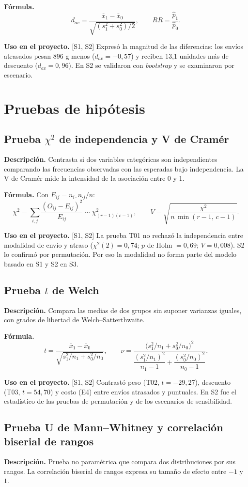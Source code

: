 \documentclass[11pt,a4paper]{article}
\newcommand{\desc}{\textbf{Descripción.} }
\newcommand{\formula}{\textbf{Fórmula.} }
\newcommand{\uso}{\textbf{Uso en el proyecto.} }
\newcommand{\fase}[1]{{\footnotesize\color{gris}[#1]}}
\begin{document}
\formula
\[
d_{av}=\frac{\bar x_1-\bar x_0}{\sqrt{(s_1^2+s_0^2)/2}},\qquad RR=\frac{\hat p_1}{\hat p_0}.
\]

\uso \fase{S1, S2} Expresó la magnitud de las diferencias: los envíos atrasados pesan 896 g menos ($d_{av}=-0{,}57$) y reciben 13,1 unidades más de descuento ($d_{av}=0{,}96$). En S2 se validaron con \emph{bootstrap} y se examinaron por escenario.

\section{Pruebas de hipótesis}\label{sec:pruebas}

\subsection{Prueba $\chi^2$ de independencia y V de Cramér}
\desc Contrasta si dos variables categóricas son independientes comparando las frecuencias observadas con las esperadas bajo independencia. La V de Cramér mide la intensidad de la asociación entre 0 y 1.

\formula Con $E_{ij}=n_{i\cdot}n_{\cdot j}/n$:
\[
\chi^2=\sum_{i,j}\frac{(O_{ij}-E_{ij})^2}{E_{ij}}\sim\chi^2_{(r-1)(c-1)},\qquad V=\sqrt{\frac{\chi^2}{n\,\min(r-1,\,c-1)}} .
\]

\uso \fase{S1, S2} La prueba T01 no rechazó la independencia entre modalidad de envío y atraso ($\chi^2(2)=0{,}74$; $p$ de Holm $=0{,}69$; $V=0{,}008$). S2 lo confirmó por permutación. Por eso la modalidad no forma parte del modelo basado en S1 y S2 en S3.

\subsection{Prueba $t$ de Welch}
\desc Compara las medias de dos grupos sin suponer varianzas iguales, con grados de libertad de Welch--Satterthwaite.

\formula
\[
t=\frac{\bar x_1-\bar x_0}{\sqrt{s_1^2/n_1+s_0^2/n_0}},\qquad
\nu=\frac{\big(s_1^2/n_1+s_0^2/n_0\big)^2}{\dfrac{(s_1^2/n_1)^2}{n_1-1}+\dfrac{(s_0^2/n_0)^2}{n_0-1}} .
\]

\uso \fase{S1, S2} Contrastó peso (T02, $t=-29{,}27$), descuento (T03, $t=54{,}70$) y costo (E4) entre envíos atrasados y puntuales. En S2 fue el estadístico de las pruebas de permutación y de los escenarios de sensibilidad.

\subsection{Prueba U de Mann--Whitney y correlación biserial de rangos}
\desc Prueba no paramétrica que compara dos distribuciones por sus rangos. La correlación biserial de rangos expresa su tamaño de efecto entre $-1$ y $1$.
\end{document}
